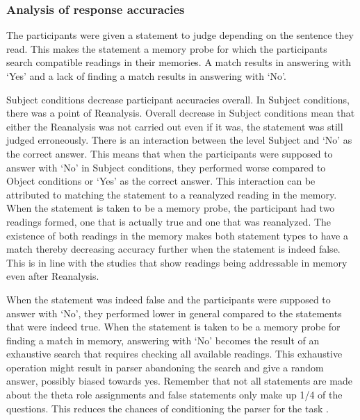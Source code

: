 \subsubsection{Analysis of response accuracies}

The participants were given a statement to judge depending on the sentence they read. This makes the statement a memory probe for which the participants search compatible readings in their memories. A match results in answering with `Yes' and a lack of finding a match results in answering with `No'. 

Subject conditions decrease participant accuracies overall. In Subject conditions, there was a point of Reanalysis. Overall decrease in Subject conditions mean that either the Reanalysis was not carried out even if it was, the statement was still judged erroneously. There is an interaction between the level Subject and `No' as the correct answer. This means that when the participants were supposed to answer with `No' in Subject conditions, they performed worse compared to Object conditions or `Yes' as the correct answer. This interaction can be attributed to matching the statement to a reanalyzed reading in the memory. When the statement is taken to be a memory probe, the participant had two readings formed, one that is actually true and one that was reanalyzed. The existence of both readings in the memory makes both statement types to have a match thereby decreasing accuracy further when the statement is indeed false. This is in line with the studies that show readings being addressable in memory \citep{christianson2001thematic,van2006activation,Slattery2013} even after Reanalysis.

When the statement was indeed false and the participants were supposed to answer with `No', they performed lower in general compared to the statements that were indeed true. When the statement is taken to be a memory probe for finding a match in memory, answering with `No' becomes the result of an exhaustive search that requires checking all available readings. This exhaustive operation might result in parser abandoning the search and give a random answer, possibly biased towards yes. Remember that not all statements are made about the theta role assignments and false statements only make up 1/4 of the questions. This reduces the chances of conditioning the parser for the task \citep{Swets2008,logavcev2016multiple}. 

